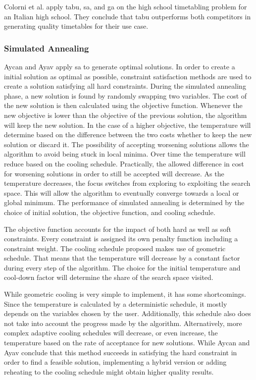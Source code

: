Colorni et al. \cite{colorni1999} apply \acrlong{tabu}, \acrlong{sa}, and \acrlong{ga} on the high school timetabling problem for an Italian high school. They conclude that \acrshort{tabu} outperforms both competitors in generating quality timetables for their use case.



\subsubsection{Simulated Annealing}

Aycan and Ayav \cite{aycan2009} apply \acrfull{sa} \cite{kirkpatrick1983} to generate optimal solutions. In order to create a initial solution as optimal as possible, constraint satisfaction methods are used to create a solution satisfying all hard constraints. During the simulated annealing phase, a new solution is found by randomly swapping two variables. The cost of the new solution is then calculated using the objective function. Whenever the new objective is lower than the objective of the previous solution, the algorithm will keep the new solution. In the case of a higher objective, the temperature will determine based on the difference between the two costs whether to keep the new solution or discard it. The possibility of accepting worsening solutions allows the algorithm to avoid being stuck in local minima. Over time the temperature will reduce based on the cooling schedule. Practically, the allowed difference in cost for worsening solutions in order to still be accepted will decrease. As the temperature decreases, the focus switches from exploring to exploiting the search space. This will allow the algorithm to eventually converge towards a local or global minimum. The performance of simulated annealing is determined by the choice of initial solution, the objective function, and cooling schedule. 

The objective function accounts for the impact of both hard as well as soft constraints. Every constraint is assigned its own penalty function including a constraint weight. The cooling schedule proposed makes use of geometric schedule. That means that the temperature will decrease by a constant factor during every step of the algorithm. The choice for the initial temperature and cool-down factor will determine the share of the search space visited. 

While geometric cooling is very simple to implement, it has some shortcomings. Since the temperature is calculated by a deterministic schedule, it mostly depends on the variables chosen by the user. Additionally, this schedule also does not take into account the progress made by the algorithm. Alternatively, more complex adaptive cooling schedules will decrease, or even increase, the temperature based on the rate of acceptance for new solutions. While Aycan and Ayav conclude that this method succeeds in satisfying the hard constraint in order to find a feasible solution, implementing a hybrid version or adding reheating to the cooling schedule might obtain higher quality results.

